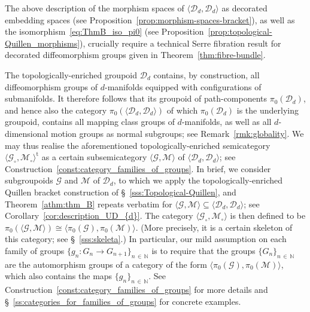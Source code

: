\documentclass[AHL,Unicode,published]{cedram}
\newcommand{\mt}{\mathrm{t}}
\newcommand{\cD}{\mathcal{D}}
\newcommand{\cG}{\mathcal{G}}
\newcommand{\cM}{\mathcal{M}}
\newcommand{\bN}{\mathbb{N}}
\begin{document}
The above description of the morphism spaces of $\langle \cD_{d},\cD_{d} \rangle$ as decorated embedding spaces (see Proposition~\ref{prop:morphism-spaces-bracket}), as well as the isomorphism~\eqref{eq:ThmB_iso_pi0} (see Proposition~\ref{prop:topological-Quillen_morphisms}), crucially require a technical Serre fibration result for decorated diffeomorphism groups given in Theorem~\ref{thm:fibre-bundle}.

The topologically-enriched groupoid $\cD_{d}$ contains, by construction, all diffeomorphism groups of $d$-manifolds equipped with configurations of submanifolds. It therefore follows that its groupoid of path-components $\pi_{0}(\cD_{d})$, and hence also the category $\pi_{0}(\langle \cD_{d},\cD_{d} \rangle)$ of which $\pi_{0}(\cD_{d})$ is the underlying groupoid, contains all mapping class groups of $d$-manifolds, as well as all $d$-dimensional motion groups as normal subgroups; see Remark~\ref{rmk:globality}. We may thus realise the aforementioned topologically-enriched semicategory $\langle \cG_{\circ}, \cM_{\circ} \rangle^{\mt}$ as a certain subsemicategory $\langle \cG, \cM \rangle$ of $\langle \cD_{d},\cD_{d} \rangle$; see Construction~\ref{const:category_families_of_groups}. In brief, we consider subgroupoids $\cG$ and $\cM$ of $\cD_{d}$, to which we apply the topologically-enriched Quillen bracket construction of \S~\ref{sss:Topological-Quillen}, and Theorem~\ref{athm:thm_B} repeats verbatim for $\langle\cG,\cM\rangle \subseteq \langle \cD_{d},\cD_{d} \rangle$; see Corollary~\ref{cor:description_UD_{d}}. The category $\langle \cG_{\circ}, \cM_{\circ} \rangle$ is then defined to be $\pi_{0}(\langle \cG, \cM \rangle)\cong \langle\pi_{0}(\cG),\pi_{0}(\cM)\rangle$. (More precisely, it is a certain skeleton of this category; see \S~\ref{sss:skeleta}.) In particular, our mild assumption on each family of groups $\{g_{n} \colon G_{n} \to G_{n+1}\}_{n\,\in\,\bN}$ is to require that the groups $\{G_{n}\}_{n\,\in\,\bN}$ are the automorphism groups of a category of the form $\langle\pi_{0}(\cG),\pi_{0}(\cM)\rangle$, which also contains the maps $\{g_{n}\}_{n\,\in\,\bN}$. See Construction~\ref{const:category_families_of_groups} for more details and \S~\ref{ss:categories_for_families_of_groups} for concrete examples.
\end{document}
